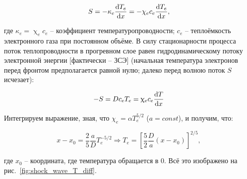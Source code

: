 \documentclass[10pt, a4paper]{article}
\begin{document}
\begin{equation*}
	S=-\kappa_e \dv{T_e}{x}=-\chi_e c_e \dv{T_e}{x},
\end{equation*}

где $\kappa_e = \upchi_e c_e$ -- коэффициент температуропроводности; $c_e$ -- теплоёмкость электронного газа при постоянном объёме. В силу стационарности процесса поток теплопроводности в прогревном слое равен гидродинамическому потоку электронной энергии [фактически -- ЗСЭ] (начальная температура электронов перед фронтом предполагается равной нулю; далеко перед волною поток $S$ исчезает):

\begin{equation*}
	-S= D c_e T_e = \upchi_e c_e \dv{T}{x}
\end{equation*}

Интегрируем выражение, зная, что $\chi_e=\alpha T_e^{5/2}$ ($a=const$), и получим, что:

\begin{equation*}
	x-x_0 = \frac{2}{5} \frac{a}{D} T_e^{-5/2} \Rightarrow T_e = \left[\frac{5}{2} \frac{D}{a} (x-x_0) \right]^{2/5},
\end{equation*}

где $x_0$ -- координата, где температура обращается в 0. Всё это изображено на рис.~\ref{fig:shock_wave_T_diff}.
\end{document}
